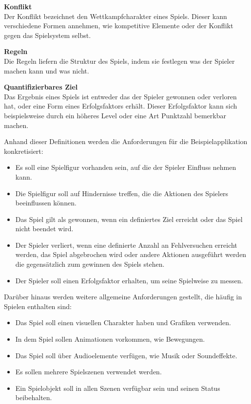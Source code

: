 \bigskip
\textbf{Konflikt}\\
Der Konflikt bezeichnet den Wettkampfcharakter eines Spiels. Dieser kann verschiedene Formen annehmen, wie kompetitive Elemente oder der Konflikt gegen das Spielsystem selbst. 

\bigskip
\textbf{Regeln}\\
Die Regeln liefern die Struktur des Spiels, indem sie festlegen was der Spieler machen kann und was nicht.

\bigskip
\textbf{Quantifizierbares Ziel}\\
Das Ergebnis eines Spiels ist entweder das der Spieler gewonnen oder verloren hat, oder eine Form eines Erfolgsfaktors erhält. Dieser Erfolgsfaktor kann sich beispielsweise durch ein höheres Level oder eine Art Punktzahl bemerkbar machen. 

\bigskip
Anhand dieser Definitionen werden die Anforderungen für die Beispielapplikation konkretisiert:

\begin{itemize}
	\item Es soll eine Spielfigur vorhanden sein, auf die der Spieler Einfluss nehmen kann.
	\item Die Spielfigur soll auf Hindernisse treffen, die die Aktionen des Spielers beeinflussen können.
	\item Das Spiel gilt als gewonnen, wenn ein definiertes Ziel erreicht oder das Spiel nicht beendet wird.
	\item Der Spieler verliert, wenn eine definierte Anzahl an Fehlversuchen erreicht werden, das Spiel abgebrochen wird oder andere Aktionen ausgeführt werden die gegensätzlich zum gewinnen des Spiels stehen.
	\item Der Spieler soll einen Erfolgsfaktor erhalten, um seine Spielweise zu messen.
\end{itemize}

Darüber hinaus werden weitere allgemeine Anforderungen gestellt, die häufig in Spielen enthalten sind:

\begin{itemize}
	\item Das Spiel soll einen visuellen Charakter haben und Grafiken verwenden.
	\item In dem Spiel sollen Animationen vorkommen, wie Bewegungen. 
	\item Das Spiel soll über Audioelemente verfügen, wie Musik oder Soundeffekte.
	\item Es sollen mehrere Spielszenen verwendet werden.
	\item Ein Spielobjekt soll in allen Szenen verfügbar sein und seinen Status beibehalten.
\end{itemize}

